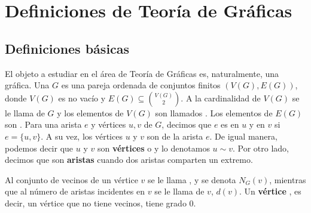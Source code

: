 \chapter{Definiciones de Teor\'ia de Gr\'aficas}%
\label{cap:defs grafs}

\section{Definiciones b\'asicas}%
\label{sec:def-basicas}

El objeto a estudiar en el \'area de Teor\'ia de Gr\'aficas es, naturalmente,
una gr\'afica. Una  $G$ es una pareja ordenada de conjuntos
finitos $(V(G), E(G))$, donde $V(G)$ es no vac\'io y $E(G) \subseteq
\binom{V(G)}{2}$. A la cardinalidad de $V(G)$ se le llama
 de $G$ y los elementos de $V(G)$ son llamados
. Los elementos de $E(G)$ son . Para una
arista $e$ y v\'ertices $u, v$ de $G$, decimos que $e$ es
 en $u$ y en $v$ si $e= \{u, v\}$. A su vez, los
v\'ertices $u$ y $v$ son  de la arista $e$. De
igual manera, podemos decir que $u$ y $v$ son \textbf{v\'ertices}
 o
 y lo denotamos $u \sim v$. Por otro lado,
decimos que son \textbf{aristas}
 cuando dos aristas
comparten un extremo. 

Al conjunto de vecinos de un v\'ertice $v$ se le llama
, y se denota $N_G(v)$, mientras que al n\'umero de aristas
incidentes en $v$ se le llama  de $v$, $d(v)$. Un
\textbf{v\'ertice} , es decir, un v\'ertice que
no tiene vecinos, tiene grado $0$.

